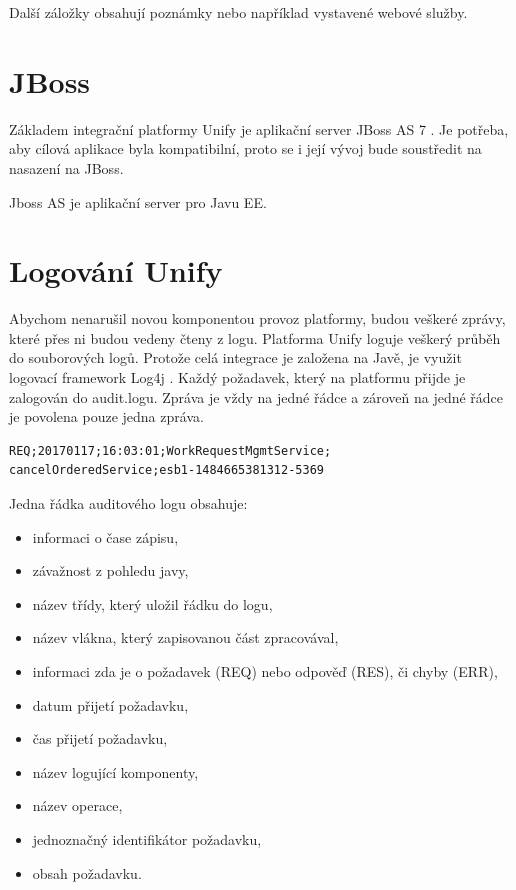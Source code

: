\documentclass[thesis=M,czech]{FITthesis}[2012/10/20]
\begin{document}
			Další záložky obsahují poznámky nebo například vystavené webové služby.
			
			
		
	\section{JBoss}
		\label{sec:jboss}
		Základem integrační platformy Unify je aplikační server JBoss AS 7 \cite{unify}. Je potřeba, aby cílová aplikace byla kompatibilní, proto se i její vývoj bude soustředit na nasazení na JBoss.
		
		Jboss AS je aplikační server pro Javu EE\cite{jboss}.

					
	\section{Logování Unify}
		\label{sec:logging_unify}
		Abychom nenarušil novou komponentou provoz platformy, budou veškeré zprávy, které přes ni budou vedeny čteny z logu. Platforma Unify loguje veškerý průběh do souborových logů. Protože celá integrace je založena na Javě, je využit logovací framework Log4j \cite{log4j}.
		Každý požadavek, který na platformu přijde je zalogován do audit.logu. Zpráva je vždy na jedné řádce a zároveň na jedné řádce je povolena pouze jedna zpráva.
		
		\begin{minipage}{\linewidth}
			\begin{lstlisting}[caption={Část řádky v auditovém logu Unify}, label={lst:log}]
REQ;20170117;16:03:01;WorkRequestMgmtService;
cancelOrderedService;esb1-1484665381312-5369
			\end{lstlisting}
		\end{minipage}
		
		Jedna řádka auditového logu obsahuje:
		
		\begin{itemize} 
			\item informaci o čase zápisu,
			\item závažnost z pohledu javy, 
			\item název třídy, který uložil řádku do logu,
			\item název vlákna, který zapisovanou část zpracovával,
			\item informaci zda je o požadavek (REQ) nebo odpověď (RES), či chyby (ERR),
			\item datum přijetí požadavku,
			\item čas přijetí požadavku,
			\item název logující komponenty,
			\item název operace,
			\item jednoznačný identifikátor požadavku,
			\item obsah požadavku.		
		\end{itemize}
		
\end{document}
